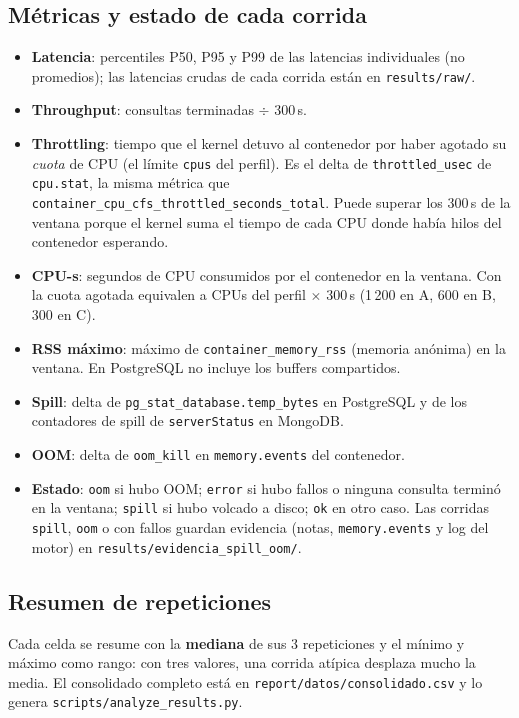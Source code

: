 \documentclass[11pt,letterpaper]{article}
\begin{document}
\subsection{Métricas y estado de cada corrida}
\begin{itemize}
  \item \textbf{Latencia}: percentiles P50, P95 y P99 de las latencias individuales (no promedios);
        las latencias crudas de cada corrida están en \texttt{results/raw/}.
  \item \textbf{Throughput}: consultas terminadas $\div$ 300\,s.
  \item \textbf{Throttling}: tiempo que el kernel detuvo al contenedor por haber agotado su
        \emph{cuota} de CPU (el límite \texttt{cpus} del perfil). Es el delta de
        \texttt{throttled\_usec} de \texttt{cpu.stat}, la misma métrica que
        \texttt{container\_cpu\_cfs\_throttled\_seconds\_total}. Puede superar los 300\,s de la
        ventana porque el kernel suma el tiempo de cada CPU donde había hilos del contenedor
        esperando.
  \item \textbf{CPU-s}: segundos de CPU consumidos por el contenedor en la ventana. Con la cuota
        agotada equivalen a CPUs del perfil $\times$ 300\,s (1\,200 en A, 600 en B, 300 en C).
  \item \textbf{RSS máximo}: máximo de \texttt{container\_memory\_rss} (memoria anónima) en la
        ventana. En PostgreSQL no incluye los buffers compartidos.
  \item \textbf{Spill}: delta de \texttt{pg\_stat\_database.temp\_bytes} en PostgreSQL y de los
        contadores de spill de \texttt{serverStatus} en MongoDB.
  \item \textbf{OOM}: delta de \texttt{oom\_kill} en \texttt{memory.events} del contenedor.
  \item \textbf{Estado}: \texttt{oom} si hubo OOM; \texttt{error} si hubo fallos o ninguna
        consulta terminó en la ventana; \texttt{spill} si hubo volcado a disco; \texttt{ok} en
        otro caso. Las corridas \texttt{spill}, \texttt{oom} o con fallos guardan evidencia
        (notas, \texttt{memory.events} y log del motor) en \texttt{results/evidencia\_spill\_oom/}.
\end{itemize}

\subsection{Resumen de repeticiones}
Cada celda se resume con la \textbf{mediana} de sus 3 repeticiones y el mínimo y máximo como rango:
con tres valores, una corrida atípica desplaza mucho la media. El consolidado completo está
en \texttt{report/datos/consolidado.csv} y lo genera \texttt{scripts/analyze\_results.py}.
\end{document}
